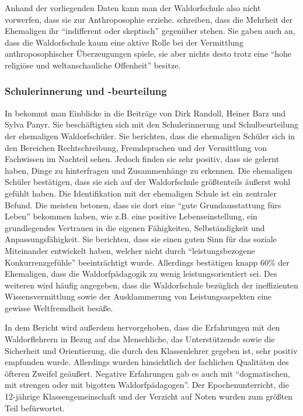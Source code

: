 Anhand der vorliegenden Daten kann man der Waldorfschule also nicht vorwerfen, dass sie zur Anthroposophie erziehe. 
\citet[][S. 19]{randoll07} schreiben, dass die Mehrheit der Ehemaligen ihr \enquote{indifferent oder skeptisch} gegenüber stehen. 
Sie gaben auch an, dass die Waldorfschule kaum eine aktive Rolle bei der Vermittlung anthroposophischer Überzeugungen spiele, sie aber nichts desto trotz eine \enquote{hohe religiöse und weltanschauliche Offenheit} besitze.

\subsubsection{Schulerinnerung und -beurteilung}
\label{subsub:Erinnerung}

In \citet[][S. 19f]{randoll07} bekommt man Einblicke in die Beiträge von Dirk Randoll, Heiner Barz und Sylva Panyr. 
Sie beschäftigten sich mit den Schulerinnerung und Schulbeurteilung der ehemaligen Waldorfschüler. 
Sie berichten, dass die ehemaligen Schüler sich in den Bereichen Rechtschreibung, Fremdsprachen und der Vermittlung von Fachwissen im Nachteil sehen. 
Jedoch finden sie sehr positiv, dass sie gelernt haben, Dinge zu hinterfragen und Zusammenhänge zu erkennen. 
Die ehemaligen Schüler bestätigen, dass sie sich auf der Waldorfschule größtenteils äußerst wohl gefühlt haben. 
Die Identifikation mit der ehemaligen Schule ist ein zentraler Befund. 
Die meisten betonen, dass sie dort eine \enquote{gute Grundausstattung fürs Leben} bekommen haben, wie z.B. eine positive Lebenseinstellung, ein grundlegendes Vertrauen in die eigenen Fähigkeiten, Selbständigkeit und Anpassungsfähigkeit. 
Sie berichten, dass sie einen guten Sinn für das soziale Miteinander entwickelt haben, welcher nicht durch \enquote{leistungsbezogene Konkurrenzgefühle} beeinträchtigt wurde. 
Allerdings bestätigen knapp 60\% der Ehemaligen, dass die Waldorfpädagogik zu wenig leistungsorientiert sei. 
Des weiteren wird häufig angegeben, dass die Waldorfschule bezüglich der ineffizienten Wissensvermittlung sowie der Ausklammerung von Leistungsaspekten eine gewisse Weltfremdheit besäße. 

In dem Bericht wird außerdem hervorgehoben, dass die Erfahrungen mit den Waldorflehrern in Bezug auf das Menschliche, das Unterstützende sowie die Sicherheit und Orientierung, die durch den Klassenlehrer gegeben ist, sehr positiv empfunden wurde. 
Allerdings wurden hinsichtlich der fachlichen Qualitäten des öfteren Zweifel geäußert. 
Negative Erfahrungen gab es auch mit \enquote{dogmatischen, mit strengen oder mit bigotten Waldorfpädagogen}. 
Der Epochenunterricht, die 12-jährige Klassengemeinschaft und der Verzicht auf Noten wurden zum größten Teil befürwortet. 















